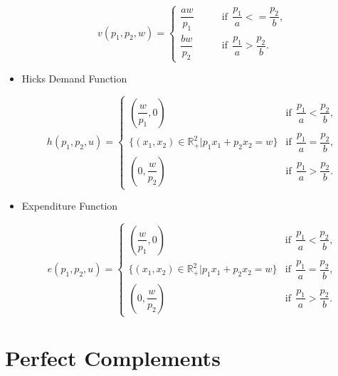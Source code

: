 \documentclass[
12pt, %
a4paper, %
onecolumn, %
portrait %
]{article}
\begin{document}
\begin{itemize}
\begin{equation*}
v(p_1,p_2,w)=\left\{
\begin{aligned}
\dfrac{aw}{p_1}\qquad&\text{if}\;\,\dfrac{p_1}{a}<=\dfrac{p_2}{b},\\
\dfrac{bw}{p_2}\qquad&\text{if}\;\,\dfrac{p_1}{a}>\dfrac{p_2}{b}.
\end{aligned}
\right.
\end{equation*}

\item Hicks Demand Function

\begin{equation*}
h(p_1,p_2,u)=\begin{cases}
\left(\dfrac{w}{p_1},0\right)&\text{if}\;\,\dfrac{p_1}{a}<\dfrac{p_2}{b},\\
\{(x_1,x_2)\in\mathbb{R}^2_+|p_1x_1+p_2x_2=w\}&\text{if}\;\, \dfrac{p_1}{a}=\dfrac{p_2}{b},\\
\left(0,\dfrac{w}{p_2}\right)&\text{if}\;\,\dfrac{p_1}{a}>\dfrac{p_2}{b}.
\end{cases}
\end{equation*}

\item Expenditure Function 

\begin{equation*}
e(p_1,p_2,u)=\begin{cases}
\left(\dfrac{w}{p_1},0\right)&\text{if}\;\,\dfrac{p_1}{a}<\dfrac{p_2}{b},\\
\{(x_1,x_2)\in\mathbb{R}^2_+|p_1x_1+p_2x_2=w\}&\text{if}\;\, \dfrac{p_1}{a}=\dfrac{p_2}{b},\\
\left(0,\dfrac{w}{p_2}\right)&\text{if}\;\,\dfrac{p_1}{a}>\dfrac{p_2}{b}.
\end{cases}
\end{equation*}

\end{itemize}




\section{Perfect Complements}
\end{document}
